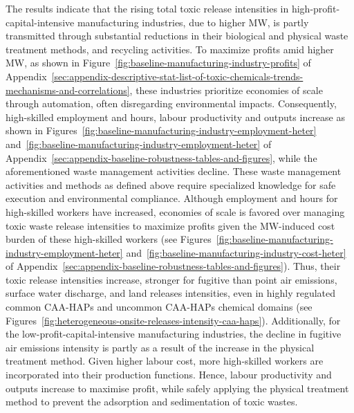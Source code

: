 \documentclass{C:/Users/david/OneDrive/Documents/ULMS/PhD/Thesis/chapter3/src/climate_change/latex/Economic_Journal/OUP-EJ}
\begin{document}
    The results indicate that the rising total toxic release intensities in high-profit-capital-intensive manufacturing industries, due to higher MW, is partly transmitted through substantial reductions in their biological and physical waste treatment methods, and recycling activities. To maximize profits amid higher MW, as shown in Figure~\ref{fig:baseline-manufacturing-industry-profits} of Appendix~\ref{sec:appendix-descriptive-stat-list-of-toxic-chemicals-trends-mechanisms-and-correlations}, these industries prioritize economies of scale through automation, often disregarding environmental impacts. Consequently, high-skilled employment and hours, labour productivity and outputs increase as shown in Figures~\ref{fig:baseline-manufacturing-industry-employment-heter} and~\ref{fig:baseline-manufacturing-industry-employment-heter} of Appendix~\ref{sec:appendix-baseline-robustness-tables-and-figures}, while the aforementioned waste management activities decline. These waste management activities and methods as defined above require specialized knowledge for safe execution and environmental compliance. Although employment and hours for high-skilled workers have increased, economies of scale is favored over managing toxic waste release intensities to maximize profits given the MW-induced cost burden of these high-skilled workers (see Figures~\ref{fig:baseline-manufacturing-industry-employment-heter} and~\ref{fig:baseline-manufacturing-industry-cost-heter} of Appendix~\ref{sec:appendix-baseline-robustness-tables-and-figures}). Thus, their toxic release intensities increase, stronger for fugitive than point air emissions, surface water discharge, and land releases intensities, even in highly regulated common CAA-HAPs and uncommon CAA-HAPs chemical domains  (see Figures~\ref{fig:heterogeneous-onsite-releases-intensity-caa-haps}). Additionally, for the low-profit-capital-intensive manufacturing industries, the decline in fugitive air emissions intensity is partly as a result of the increase in the physical treatment method. Given higher labour cost, more high-skilled workers are incorporated into their production functions. Hence, labour productivity and outputs increase to maximise profit, while safely applying the physical treatment method to prevent the adsorption and sedimentation of toxic wastes.
\end{document}
